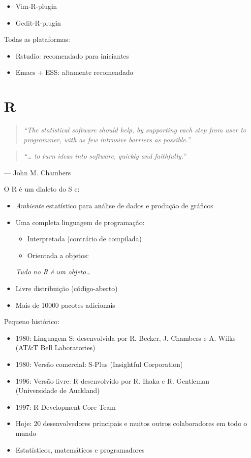 \documentclass[10pt,a4paper]{book}
\providecommand{\tightlist}{%
  \setlength{\itemsep}{0pt}\setlength{\parskip}{0pt}}
\begin{document}
\begin{itemize}
\tightlist
\item
  Vim-R-plugin
\item
  Gedit-R-plugin
\end{itemize}

Todas as plataformas:

\begin{itemize}
\tightlist
\item
  Rstudio: recomendado para iniciantes
\item
  Emacs + ESS: altamente recomendado
\end{itemize}

\section{R}\label{r}

\begin{quote}
\emph{``The statistical software should help, by supporting each step
from user to programmer, with as few intrusive barriers as possible.''}
\end{quote}

\begin{quote}
\emph{``\ldots{} to turn ideas into software, quickly and faithfully.''}
\end{quote}

--- John M. Chambers

O R é um dialeto do S e:

\begin{itemize}
\item
  \emph{Ambiente} estatístico para análise de dados e produção de
  gráficos
\item
  Uma completa linguagem de programação:

  \begin{itemize}
  \tightlist
  \item
    Interpretada (contrário de compilada)
  \item
    Orientada a objetos:
  \end{itemize}

  \emph{Tudo no R é um objeto\ldots{}}
\item
  Livre distribuição (código-aberto)
\item
  Mais de 10000 pacotes adicionais
\end{itemize}

Pequeno histórico:

\begin{itemize}
\tightlist
\item
  1980: Linguagem S: desenvolvida por R. Becker, J. Chambers e A. Wilks
  (AT\&T Bell Laboratories)
\item
  1980: Versão comercial: S-Plus (Insightful Corporation)
\item
  1996: Versão livre: R desenvolvido por R. Ihaka e R. Gentleman
  (Universidade de Auckland)
\item
  1997: R Development Core Team
\item
  Hoje: 20 desenvolvedores principais e muitos outros colaboradores em
  todo o mundo
\item
  Estatísticos, matemáticos e programadores
\end{itemize}
\end{document}

